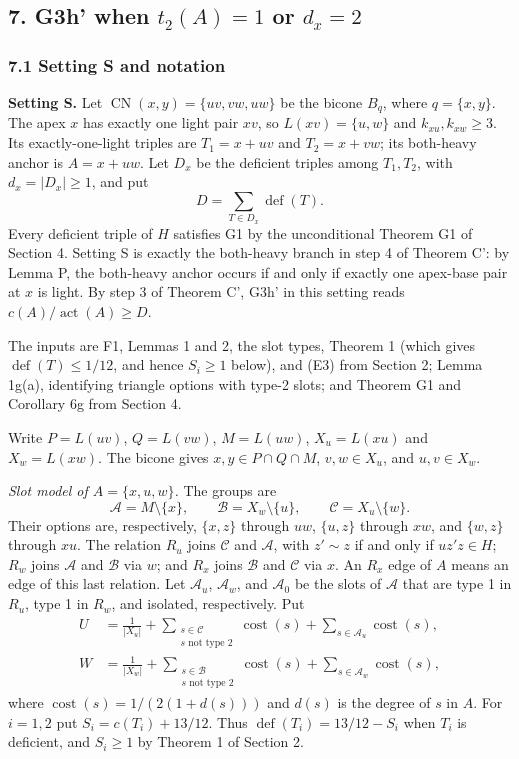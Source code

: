 \subsection*{7. G3h' when $t_2(A)=1$ or $d_x=2$}

\subsubsection*{7.1 Setting S and notation}
\textbf{Setting S.} Let $\operatorname{CN}(x,y)=\{uv,vw,uw\}$ be the bicone $B_q$, where $q=\{x,y\}$. The apex $x$ has exactly one light pair $xv$, so $L(xv)=\{u,w\}$ and $k_{xu},k_{xw}\ge3$. Its exactly-one-light triples are $T_1=x+uv$ and $T_2=x+vw$; its both-heavy anchor is $A=x+uw$. Let $D_x$ be the deficient triples among $T_1,T_2$, with $d_x=|D_x|\ge1$, and put
\[
 D=\sum_{T\in D_x}\operatorname{def}(T).
\]
Every deficient triple of $H$ satisfies G1 by the unconditional Theorem G1 of Section 4. Setting S is exactly the both-heavy branch in step 4 of Theorem C': by Lemma P, the both-heavy anchor occurs if and only if exactly one apex-base pair at $x$ is light. By step 3 of Theorem C', G3h' in this setting reads $c(A)/\operatorname{act}(A)\ge D$.

The inputs are F1, Lemmas 1 and 2, the slot types, Theorem 1 (which gives $\operatorname{def}(T)\le1/12$, and hence $S_i\ge1$ below), and (E3) from Section 2; Lemma 1g(a), identifying triangle options with type-2 slots; and Theorem G1 and Corollary 6g from Section 4.

Write $P=L(uv)$, $Q=L(vw)$, $M=L(uw)$, $X_u=L(xu)$ and $X_w=L(xw)$. The bicone gives $x,y\in P\cap Q\cap M$, $v,w\in X_u$, and $u,v\in X_w$.

\emph{Slot model of $A=\{x,u,w\}$.} The groups are
\[
 \mathcal A=M\setminus\{x\},\qquad
 \mathcal B=X_w\setminus\{u\},\qquad
 \mathcal C=X_u\setminus\{w\}.
\]
Their options are, respectively, $\{x,z\}$ through $uw$, $\{u,z\}$ through $xw$, and $\{w,z\}$ through $xu$. The relation $R_u$ joins $\mathcal C$ and $\mathcal A$, with $z'\sim z$ if and only if $uz'z\in H$; $R_w$ joins $\mathcal A$ and $\mathcal B$ via $w$; and $R_x$ joins $\mathcal B$ and $\mathcal C$ via $x$. An $R_x$ edge of $A$ means an edge of this last relation. Let $\mathcal A_u$, $\mathcal A_w$, and $\mathcal A_0$ be the slots of $\mathcal A$ that are type 1 in $R_u$, type 1 in $R_w$, and isolated, respectively. Put
\[
\begin{aligned}
 U&=\frac1{|X_u|}+\sum_{\substack{s\in\mathcal C\\s\text{ not type 2}}}\operatorname{cost}(s)
       +\sum_{s\in\mathcal A_u}\operatorname{cost}(s),\\
 W&=\frac1{|X_w|}+\sum_{\substack{s\in\mathcal B\\s\text{ not type 2}}}\operatorname{cost}(s)
       +\sum_{s\in\mathcal A_w}\operatorname{cost}(s),
\end{aligned}
\]
where $\operatorname{cost}(s)=1/(2(1+d(s)))$ and $d(s)$ is the degree of $s$ in $A$. For $i=1,2$ put $S_i=c(T_i)+13/12$. Thus $\operatorname{def}(T_i)=13/12-S_i$ when $T_i$ is deficient, and $S_i\ge1$ by Theorem 1 of Section 2.

